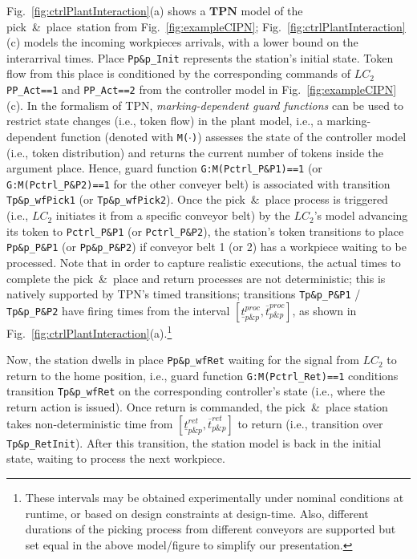 Fig.~\ref{fig:ctrlPlantInteraction}(a) shows a $\mathbf{TPN}$ model of the pick~\&~place~station from Fig.~\ref{fig:exampleCIPN}; Fig.~\ref{fig:ctrlPlantInteraction}(c) models  the incoming workpieces arrivals, with a lower bound on the interarrival times.
 Place \verb!Pp&p_Init! represents the station's initial state. Token flow from this place is conditioned by the corresponding commands of $LC_2$ \verb!PP_Act==1! and \verb!PP_Act==2! from the controller model in Fig.~\ref{fig:exampleCIPN}(c). In the formalism of TPN, \emph{marking-dependent guard functions} can be used to restrict state changes (i.e., token flow) in the plant model, i.e., a marking-dependent function (denoted with \verb!M(!$\cdot$\verb!)!) assesses the state of the controller model (i.e., token distribution) and returns the current number of tokens inside the argument place. Hence, guard function \verb!G:M(Pctrl_P&P1)==1! (or \verb!G:M(Pctrl_P&P2)==1!  for the other conveyer belt) is associated with transition \verb!Tp&p_wfPick1! (or \verb!Tp&p_wfPick2!).
%
%
Once the pick~\&~place process is triggered (i.e., $LC_2$ initiates it from a specific conveyor belt) by the $LC_2$'s model advancing its token to \verb!Pctrl_P&P1! (or \verb!Pctrl_P&P2!), the station's token transitions to place \verb!Pp&p_P&P1! (or \verb!Pp&p_P&P2!) if conveyor belt 1 (or 2) has a workpiece waiting to be processed.
Note that in order to capture realistic executions, the actual times to complete the pick~\&~place and return processes are not deterministic; this is natively supported by TPN's timed transitions; transitions \verb!Tp&p_P&P1! / \verb!Tp&p_P&P2! have firing times from the interval $[\underline{t}_{p\&p}^{proc},\overline{t}_{p\&p}^{proc}]$, as shown in Fig.~\ref{fig:ctrlPlantInteraction}(a).\footnote{These intervals may be obtained experimentally under nominal conditions at runtime, or based on design constraints %
at design-time. Also, different durations of the picking process from different conveyors are supported but set equal in the above model/figure to simplify our presentation.} %


Now, the station dwells in place \verb!Pp&p_wfRet! waiting for the signal from $LC_2$ to return to the home position, i.e., guard function \verb!G:M(Pctrl_Ret)==1! conditions transition \verb!Tp&p_wfRet! on the corresponding controller's state (i.e., where the return action is issued). Once return is commanded, the pick~\&~place station takes non-deterministic time from %
$[\underline{t}_{p\&p}^{ret},\overline{t}_{p\&p}^{ret}]$ to return (i.e., transition over \verb!Tp&p_RetInit!). After this transition, %
the station model is back in the initial state, waiting to process the next workpiece. %


